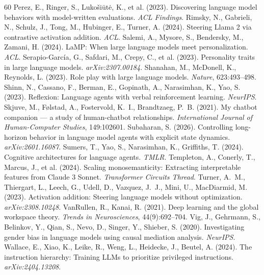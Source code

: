 \documentclass{article}
\begin{document}
\begin{thebibliography}{60}
 Perez, E., Ringer, S., Luko\v{s}i\=ut\.e, K., et al. (2023). Discovering language model behaviors with model-written evaluations. \emph{ACL Findings}.
 Rimsky, N., Gabrieli, N., Schulz, J., Tong, M., Hubinger, E., Turner, A. (2024). Steering Llama 2 via contrastive activation addition. \emph{ACL}.
 Salemi, A., Mysore, S., Bendersky, M., Zamani, H. (2024). LaMP: When large language models meet personalization. \emph{ACL}.
 Serapio-Garc\'ia, G., Safdari, M., Crepy, C., et al. (2023). Personality traits in large language models. \emph{arXiv:2307.00184}.
 Shanahan, M., McDonell, K., Reynolds, L. (2023). Role play with large language models. \emph{Nature}, 623:493--498.
 Shinn, N., Cassano, F., Berman, E., Gopinath, A., Narasimhan, K., Yao, S. (2023). Reflexion: Language agents with verbal reinforcement learning. \emph{NeurIPS}.
 Skjuve, M., F\o lstad, A., Fostervold, K.~I., Brandtzaeg, P.~B. (2021). My chatbot companion --- a study of human-chatbot relationships. \emph{International Journal of Human-Computer Studies}, 149:102601.
 Subaharan, S. (2026). Controlling long-horizon behavior in language model agents with explicit state dynamics. \emph{arXiv:2601.16087}.
 Sumers, T., Yao, S., Narasimhan, K., Griffiths, T. (2024). Cognitive architectures for language agents. \emph{TMLR}.
 Templeton, A., Conerly, T., Marcus, J., et al. (2024). Scaling monosemanticity: Extracting interpretable features from Claude 3 Sonnet. \emph{Transformer Circuits Thread}.
 Turner, A.~M., Thiergart, L., Leech, G., Udell, D., Vazquez, J.~J., Mini, U., MacDiarmid, M. (2023). Activation addition: Steering language models without optimization. \emph{arXiv:2308.10248}.
 VanRullen, R., Kanai, R. (2021). Deep learning and the global workspace theory. \emph{Trends in Neurosciences}, 44(9):692--704.
 Vig, J., Gehrmann, S., Belinkov, Y., Qian, S., Nevo, D., Singer, Y., Shieber, S. (2020). Investigating gender bias in language models using causal mediation analysis. \emph{NeurIPS}.
 Wallace, E., Xiao, K., Leike, R., Weng, L., Heidecke, J., Beutel, A. (2024). The instruction hierarchy: Training LLMs to prioritize privileged instructions. \emph{arXiv:2404.13208}.

\end{thebibliography}
\end{document}
